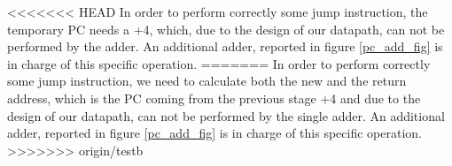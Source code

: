 <<<<<<< HEAD
In order to perform correctly some jump instruction, the temporary PC needs a +4, which, due to the design of our datapath, can not be performed by the adder. An additional adder, reported in figure \ref{pc_add_fig} is in charge of this specific operation.
=======
In order to perform correctly some jump instruction, we need to calculate both 
the new and the return address, which is the PC coming from the previous stage 
+4 and due to the design of our datapath, can not be performed by the single 
adder. An additional adder, reported in figure \ref{pc_add_fig} is in charge of 
this specific operation.
>>>>>>> origin/testb






